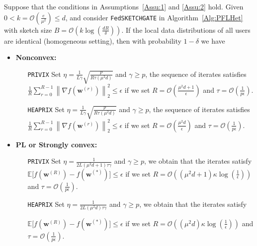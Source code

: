\documentclass[review,onefignum,onetabnum]{siamart190516}
\begin{document}
\begin{theorem}\label{thm:hetereg_case}
  Suppose that the conditions in Assumptions~\ref{Assu:1} and \ref{Assu:2} hold. Given $0<k=\mathcal{O}\left(\frac{e}{\mu^2}\right)\leq d$, and consider \texttt{FedSKETCHGATE} in Algorithm~\ref{Alg:PFLHet} with sketch size $B=\mathcal{O}\left(k\log\left(\frac{d R}{\delta}\right)\right)$. If the local data distributions of all users are identical (homogeneous setting), then with probability $1-\delta$ we have  
 \begin{itemize}
     \item \textbf{Nonconvex:}  
     \begin{itemize}
         \item [\texttt{PRIVIX}] Set $\eta=\frac{1}{L\gamma}\sqrt{\frac{p}{R\tau\left(\mu^2d\right)}}$ and $\gamma\geq p$, the sequence of iterates satisfies  $\frac{1}{R}\sum_{r=0}^{R-1}\left\|\nabla f({\boldsymbol{w}}^{(r)})\right\|_2^2\leq {\epsilon}$ if we set
     $R=\mathcal{O}\left(\frac{\mu^2d+1}{\epsilon}\right)$ and $ \tau=\mathcal{O}\left(\frac{1}{{p}\epsilon}\right)$.

         \item [\texttt{HEAPRIX}] Set 
 $\eta=\frac{1}{L\gamma}\sqrt{\frac{p}{R\tau\left(\mu^2d\right)}}$ and $\gamma\geq p$, the sequence of iterates satisfies  $\frac{1}{R}\sum_{r=0}^{R-1}\left\|\nabla f({\boldsymbol{w}}^{(r)})\right\|_2^2\leq {\epsilon}$ if we set
     $R=\mathcal{O}\left(\frac{\mu^2d}{\epsilon}\right)$ and $ \tau=\mathcal{O}\left(\frac{1}{{p}\epsilon}\right)$. 
     \end{itemize}
     
     \item \textbf{PL or Strongly convex:}
      \begin{itemize}
         \item [\texttt{PRIVIX}] Set $\eta=\frac{1}{2L\left({\mu^2d}+1\right)\tau\gamma}$ and $\gamma\geq p$, we obtain that the iterates satisfy $\mathbb{E}\Big[f({\boldsymbol{w}}^{(R)})-f({\boldsymbol{w}}^{(*)})\Big]\leq \epsilon$ if  we set
     $R=\mathcal{O}\left(\left(\mu^2d+1\right)\kappa\log\left(\frac{1}{\epsilon}\right)\right)$ and $ \tau=\mathcal{O}\left(\frac{1}{p\epsilon}\right)$.
          
         \item [\texttt{HEAPRIX}] Set $\eta=\frac{1}{2L\left(\mu^2d\right)\tau\gamma}$ and $\gamma\geq p$, we obtain that the iterates satisfy
         
         $\mathbb{E}\Big[f({\boldsymbol{w}}^{(R)})-f({\boldsymbol{w}}^{(*)})\Big]\leq \epsilon$ if  we set
     $R=\mathcal{O}\left(\left(\mu^2d\right)\kappa\log\left(\frac{1}{\epsilon}\right)\right)$ and $ \tau=\mathcal{O}\left(\frac{1}{p\epsilon}\right)$. 
      \end{itemize}
      

\end{itemize}
\end{theorem}
\end{document}
